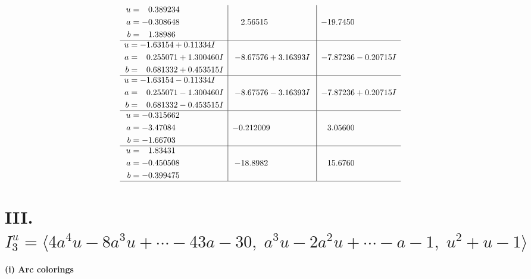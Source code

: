 \documentclass[1p]{elsarticle_modified}
\theoremstyle{definition}
\begin{document}
$$\begin{array}{c|c|c}
\begin{aligned}
u &= \phantom{-}0.389234\phantom{ +0.000000I} \\
a &= -0.308648\phantom{ +0.000000I} \\
b &= \phantom{-}1.38986\phantom{ +0.000000I}\end{aligned}
 & \phantom{-}2.56515\phantom{ +0.000000I} & -19.7450\phantom{ +0.000000I} \\ \hline\begin{aligned}
u &= -1.63154 + 0.11334 I \\
a &= \phantom{-}0.255071 + 1.300460 I \\
b &= \phantom{-}0.681332 + 0.453515 I\end{aligned}
 & -8.67576 + 3.16393 I & -7.87236 - 0.20715 I \\ \hline\begin{aligned}
u &= -1.63154 - 0.11334 I \\
a &= \phantom{-}0.255071 - 1.300460 I \\
b &= \phantom{-}0.681332 - 0.453515 I\end{aligned}
 & -8.67576 - 3.16393 I & -7.87236 + 0.20715 I \\ \hline\begin{aligned}
u &= -0.315662\phantom{ +0.000000I} \\
a &= -3.47084\phantom{ +0.000000I} \\
b &= -1.66703\phantom{ +0.000000I}\end{aligned}
 & -0.212009\phantom{ +0.000000I} & \phantom{-}3.05600\phantom{ +0.000000I} \\ \hline\begin{aligned}
u &= \phantom{-}1.83431\phantom{ +0.000000I} \\
a &= -0.450508\phantom{ +0.000000I} \\
b &= -0.399475\phantom{ +0.000000I}\end{aligned}
 & -18.8982\phantom{ +0.000000I} & \phantom{-}15.6760\phantom{ +0.000000I}\\
 \hline 
 \end{array}$$\newpage\newpage\renewcommand{\arraystretch}{1}
\centering \section*{III. $I^u_{3}= \langle 4 a^4 u-8 a^3 u+\cdots-43 a-30,\;a^3 u-2 a^2 u+\cdots- a-1,\;u^2+u-1 \rangle$}
\flushleft \textbf{(i) Arc colorings}\\
\end{document}

